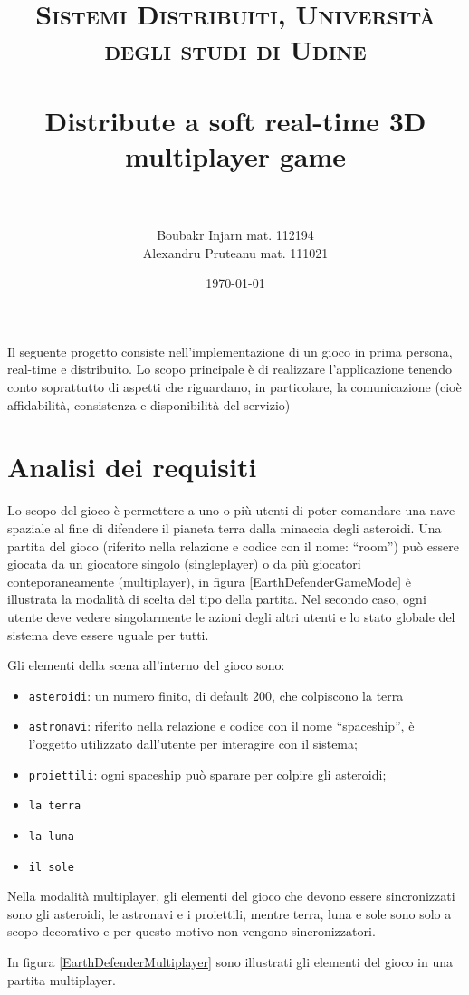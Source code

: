 \documentclass[paper=a4, fontsize=11pt]{scrartcl} %
\title{	
\normalfont \normalsize 
\textsc{Sistemi Distribuiti, Università degli studi di Udine} \\ [25pt] %
\horrule{0.5pt} \\[0.4cm] %
\huge Distribute a soft real-time 3D multiplayer game\\%
\horrule{2pt} \\[0.5cm] %
}
\author{Boubakr Injarn mat. 112194\\Alexandru Pruteanu mat. 111021} %
\date{\normalsize\today} %
\numberwithin{equation}{section} %
\numberwithin{figure}{section} %
\numberwithin{table}{section} %
\begin{document}
\maketitle %
\newpage
\tableofcontents
\listoffigures
\newpage
\textbf{\abstractname}

Il seguente progetto consiste nell'implementazione di un gioco in prima persona,
real-time e distribuito. Lo scopo principale è di realizzare l'applicazione tenendo
conto soprattutto di aspetti che riguardano, in particolare, la comunicazione
(cioè affidabilità, consistenza e disponibilità del servizio)

\section{Analisi dei requisiti}
Lo scopo del gioco è permettere a uno o più utenti di poter comandare una nave spaziale al fine di difendere il pianeta terra dalla minaccia degli asteroidi.
Una partita del gioco (riferito nella relazione e codice con il nome: ``room'') può essere giocata da un giocatore singolo (singleplayer) o da più
giocatori conteporaneamente (multiplayer), in figura \ref{EarthDefenderGameMode} è illustrata la modalità di scelta del tipo della partita.
Nel secondo caso, ogni utente deve vedere singolarmente le azioni degli altri utenti e lo stato globale del sistema deve essere uguale per tutti.

Gli elementi della scena all'interno del gioco sono:
\begin{itemize}
\item \texttt{asteroidi}: un numero finito, di default 200, che colpiscono la terra
\item \texttt{astronavi}: riferito nella relazione e codice con il nome ``spaceship'', è l'oggetto utilizzato dall'utente per interagire con il sistema;
\item \texttt{proiettili}: ogni spaceship può sparare per colpire gli asteroidi;
\item \texttt{la terra}
\item \texttt{la luna}
\item \texttt{il sole}
\end{itemize}

Nella modalità multiplayer, gli elementi del gioco che devono essere sincronizzati sono gli asteroidi, le astronavi e i proiettili, mentre terra, luna e sole sono solo a scopo decorativo e per questo motivo non vengono sincronizzatori.

In figura \ref{EarthDefenderMultiplayer} sono illustrati gli elementi del gioco in una partita multiplayer.
\end{document}
